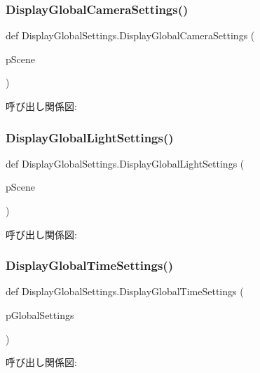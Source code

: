 \subsubsection{\texorpdfstring{Display\+Global\+Camera\+Settings()}{DisplayGlobalCameraSettings()}}
{\footnotesize\ttfamily def Display\+Global\+Settings.\+Display\+Global\+Camera\+Settings (\begin{DoxyParamCaption}\item[{}]{p\+Scene }\end{DoxyParamCaption})}

呼び出し関係図\+:
\mbox{\label{namespace_display_global_settings_aed5dc6eed71477fb263de87414837f89}} 
\subsubsection{\texorpdfstring{Display\+Global\+Light\+Settings()}{DisplayGlobalLightSettings()}}
{\footnotesize\ttfamily def Display\+Global\+Settings.\+Display\+Global\+Light\+Settings (\begin{DoxyParamCaption}\item[{}]{p\+Scene }\end{DoxyParamCaption})}

呼び出し関係図\+:
\mbox{\label{namespace_display_global_settings_af586478da702508b3e252312017a1025}} 
\subsubsection{\texorpdfstring{Display\+Global\+Time\+Settings()}{DisplayGlobalTimeSettings()}}
{\footnotesize\ttfamily def Display\+Global\+Settings.\+Display\+Global\+Time\+Settings (\begin{DoxyParamCaption}\item[{}]{p\+Global\+Settings }\end{DoxyParamCaption})}

呼び出し関係図\+:
